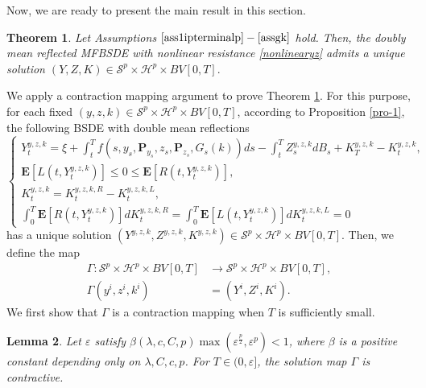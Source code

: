 \documentclass[10pt]{article}%
\numberwithin{equation}{section}
\newtheorem{theorem}{Theorem}[section]
\newtheorem{lemma}[theorem]{Lemma}
\def \E{\mathbf{E}}
\def \P{\mathbf{P}}
\begin{document}
Now, we are ready to present the main result in this section.
\begin{theorem}\label{thlip}
 Let Assumptions $\ref{ass1ipterminalp}-\ref{assgk}$ hold. Then,  the doubly mean reflected MFBSDE with nonlinear resistance \eqref{nonlinearyz} admits a unique solution $(Y,Z,K)\in \mathcal{S}^p \times \mathcal{H}^{p} \times BV[0,T].$  
\end{theorem}

We apply a contraction mapping argument to prove Theorem \ref{thlip}. For this purpose, for each fixed $(y,z,k)\in \mathcal{S}^p \times \mathcal{H}^{p} \times BV[0,T]$, according to Proposition \ref{pro-1},   the following BSDE with double mean reflections 
\begin{equation}\label{yzk}
\begin{cases}
Y_t^{y,z,k}=\xi+\int_t^T f(s,y_s,\P_{y_s},z_s,\P_{z_s}, G_s(k))ds-\int_t^T Z_s^{y,z,k} dB_s+K_T^{y,z,k}-K_t^{y,z,k}, \\
\E[L(t,Y_t^{y,z,k})]\leq 0\leq \E[R(t,Y_t^{y,z,k})], \\
K^{y,z,k}_t=K^{y,z,k,R}_t-K^{y,z,k,L}_t, \\
\int_0^T \E[R(t,Y_t^{y,z,k})]dK_t^{y,z,k,R}=\int_0^T \E[L(t,Y_t^{y,z,k})]dK^{y,z,k,L}_t=0
\end{cases}
\end{equation}
has a unique solution $(Y^{y,z,k},Z^{y,z,k},K^{y,z,k})\in \mathcal{S}^p \times \mathcal{H}^{p} \times BV[0,T]$. Then, we define the  map
\begin{align*}
\Gamma:\mathcal{S}^p\times\mathcal{H}^{p}\times BV[0,T]&\rightarrow \mathcal{S}^p\times\mathcal{H}^{p}\times BV[0,T],  \\
\Gamma(y^i,z^i,k^i)&=(Y^i,Z^i,K^i).
\end{align*}
We first show that $\Gamma$ is a contraction mapping  when $T$ is sufficiently small. 
\begin{lemma}\label{le3-2}
Let $\varepsilon$ satisfy $\beta(\lambda,c,C,p)\max\left(\varepsilon^{\frac{p}{2}},\varepsilon^p\right)<1$, where $\beta$ is a positive constant depending only on $\lambda, C,c,p$. For $T\in (0,\varepsilon]$, the solution map $\Gamma$ is contractive. 
\end{lemma}
\end{document}
